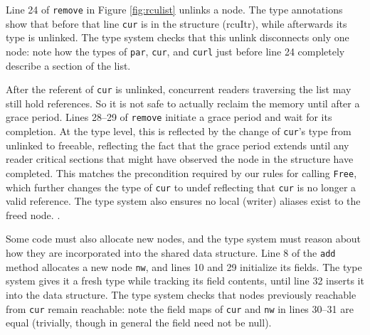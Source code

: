 Line 24 of \lstinline|remove| in Figure \ref{fig:rculist} unlinks a node.
The type annotations show that before that line \lstinline|cur| is in the structure (\textsf{rcuItr}), while afterwards its type is \textsf{unlinked}.
The type system checks that this unlink disconnects only one node: note how the types of \lstinline|par|, \lstinline|cur|, and \lstinline|curl| just before line 24 completely describe a section of the list.

After the referent of \texttt{cur} is unlinked, concurrent readers traversing the list may still hold references.  So it is not safe to actually reclaim the memory until after a grace period.
Lines 28--29 of \lstinline|remove| initiate a grace period and wait for its completion.  At the type level, this is reflected by the change of \lstinline|cur|'s type from \textsf{unlinked} to \textsf{freeable}, reflecting the fact that the grace period extends until any reader critical sections that might have observed the node in the structure have completed.
This matches the precondition required by our rules for calling \lstinline|Free|, which further changes the type of \lstinline|cur| to \textsf{undef} reflecting that \lstinline|cur| is no longer a valid reference.  The type system also ensures no local (writer) aliases exist to the freed node.  .

Some code must also allocate new nodes, and the type system must reason about how they are incorporated into the shared data structure.
Line 8 of the \texttt{add} method allocates a new node \texttt{nw}, and lines 10 and 29 initialize its fields.
The type system gives it a \textsf{fresh} type while tracking its field contents, until line 32 inserts it into the data structure.  The type system checks that nodes previously reachable from \lstinline|cur| remain reachable: note the field maps of \lstinline|cur| and \texttt{nw} in lines 30--31 are equal (trivially, though in general the field need not be  null).
